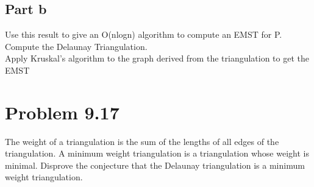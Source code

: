 \documentclass[11pt,psfig]{article}
\begin{document}
\subsection*{Part b}
Use this result to give an O(nlogn) algorithm to compute an EMST
for P.\\
Compute the Delaunay Triangulation. \\
Apply Kruskal's algorithm to the graph derived from the triangulation to get the EMST\\

\section*{Problem 9.17}

The weight of a triangulation is the sum of the lengths of all edges of
the triangulation. A minimum weight triangulation is a triangulation
whose weight is minimal. Disprove the conjecture that the Delaunay
triangulation is a minimum weight triangulation.

\end{document}

